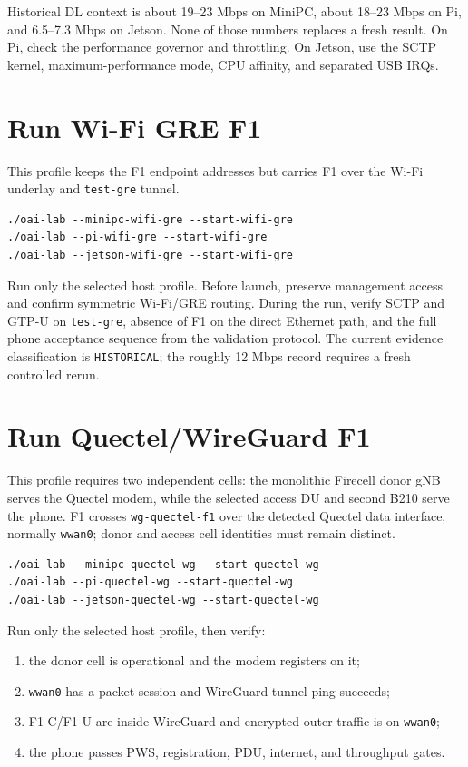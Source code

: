 \documentclass[11pt,a4paper]{article}
\begin{document}
Historical DL context is about 19--23 Mbps on MiniPC, about 18--23 Mbps on Pi,
and 6.5--7.3 Mbps on Jetson. None of those numbers replaces a fresh result.
On Pi, check the performance governor and throttling. On Jetson, use the SCTP
kernel, maximum-performance mode, CPU affinity, and separated USB IRQs.

\section{Run Wi-Fi GRE F1}

This profile keeps the F1 endpoint addresses but carries F1 over the Wi-Fi
underlay and \texttt{test-gre} tunnel.

\begin{lstlisting}
./oai-lab --minipc-wifi-gre --start-wifi-gre
./oai-lab --pi-wifi-gre --start-wifi-gre
./oai-lab --jetson-wifi-gre --start-wifi-gre
\end{lstlisting}

Run only the selected host profile. Before launch, preserve management access
and confirm symmetric Wi-Fi/GRE routing. During the run, verify SCTP and GTP-U
on \texttt{test-gre}, absence of F1 on the direct Ethernet path, and the full
phone acceptance sequence from the validation protocol. The current evidence
classification is \texttt{HISTORICAL}; the roughly 12 Mbps record requires a
fresh controlled rerun.

\section{Run Quectel/WireGuard F1}

This profile requires two independent cells: the monolithic Firecell donor gNB
serves the Quectel modem, while the selected access DU and second B210 serve
the phone. F1 crosses \texttt{wg-quectel-f1} over the detected Quectel data
interface, normally \texttt{wwan0}; donor and access cell identities must
remain distinct.

\begin{lstlisting}
./oai-lab --minipc-quectel-wg --start-quectel-wg
./oai-lab --pi-quectel-wg --start-quectel-wg
./oai-lab --jetson-quectel-wg --start-quectel-wg
\end{lstlisting}

Run only the selected host profile, then verify:

\begin{enumerate}
  \item the donor cell is operational and the modem registers on it;
  \item \texttt{wwan0} has a packet session and WireGuard tunnel ping succeeds;
  \item F1-C/F1-U are inside WireGuard and encrypted outer traffic is on \texttt{wwan0};
  \item the phone passes PWS, registration, PDU, internet, and throughput gates.
\end{enumerate}
\end{document}
